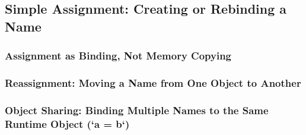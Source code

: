 \subsection{Simple Assignment: Creating or Rebinding a Name}
\subsubsection{Assignment as Binding, Not Memory Copying}
\subsubsection{Reassignment: Moving a Name from One Object to Another}
\subsubsection{Object Sharing: Binding Multiple Names to the Same Runtime Object (`a = b`)}
